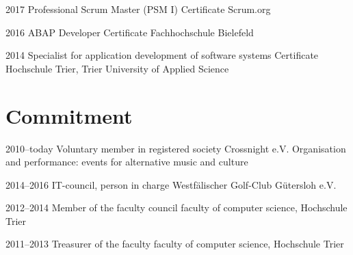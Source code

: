 \documentclass[]{friggeri-cv} %
\begin{document}
\begin{entrylist}

	
	\entry
	{2017}
	{Professional Scrum Master (PSM I)}
	{Certificate}
	{Scrum.org}
	
	
	\entry
	{2016}
	{ABAP Developer}
	{Certificate}
	{Fachhochschule Bielefeld}
	
	
	\entry
	{2014}
	{Specialist for application development of software systems}
	{Certificate}
	{Hochschule Trier, Trier University of Applied Science}

	
\end{entrylist}

\pagebreak


\section{Commitment}

\begin{entrylist}
	
	
	\entry
	{2010--today}
	{Voluntary member in registered society Crossnight e.V.}
	{}
	{Organisation and performance: events for alternative music and culture}
	
	\entry
	{2014--2016}
	{IT-council, person in charge}
	{}
	{Westf\"{a}lischer Golf-Club G\"{u}tersloh e.V.}
	
	
	
	\entry
	{2012--2014}
	{Member of the faculty council}
	{}
	{faculty of computer science, Hochschule Trier}
	
	
	\entry
	{2011--2013}
	{Treasurer of the faculty}
	{}
	{faculty of computer science, Hochschule Trier}
	
	
	
\end{entrylist}
\end{document}
